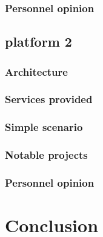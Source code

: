 \documentclass[a4paper,11pt]{report}
\begin{document}
  \subsubsection{Personnel opinion}
  
  \subsection{platform 2} %
  
  \subsubsection{Architecture}
  
  \subsubsection{Services provided}
  
  \subsubsection{Simple scenario}
  
  \subsubsection{Notable projects}
  
  \subsubsection{Personnel opinion}
  
  
  
  
  \section{Conclusion}

  
%
%
\end{document}
